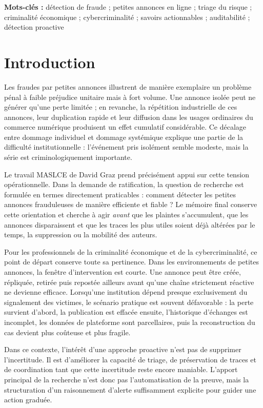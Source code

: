 \documentclass[10pt,a4paper]{article}
\begin{document}
\textbf{Mots-clés :} détection de fraude ; petites annonces en ligne ; triage du risque ; criminalité économique ; cybercriminalité ; savoirs actionnables ; auditabilité ; détection proactive

\newpage

\tableofcontents

\newpage

\section{Introduction}
Les fraudes par petites annonces illustrent de manière exemplaire un problème pénal à faible préjudice unitaire mais à fort volume. Une annonce isolée peut ne générer qu'une perte limitée ; en revanche, la répétition industrielle de ces annonces, leur duplication rapide et leur diffusion dans les usages ordinaires du commerce numérique produisent un effet cumulatif considérable. Ce décalage entre dommage individuel et dommage systémique explique une partie de la difficulté institutionnelle : l'événement pris isolément semble modeste, mais la série est criminologiquement importante.

Le travail MASLCE de David Graz prend précisément appui sur cette tension opérationnelle. Dans la demande de ratification, la question de recherche est formulée en termes directement praticables : comment détecter les petites annonces frauduleuses de manière efficiente et fiable ? Le mémoire final conserve cette orientation et cherche à agir \emph{avant} que les plaintes s'accumulent, que les annonces disparaissent et que les traces les plus utiles soient déjà altérées par le temps, la suppression ou la mobilité des auteurs.

Pour les professionnels de la criminalité économique et de la cybercriminalité, ce point de départ conserve toute sa pertinence. Dans les environnements de petites annonces, la fenêtre d'intervention est courte. Une annonce peut être créée, répliquée, retirée puis repostée ailleurs avant qu'une chaîne strictement réactive ne devienne efficace. Lorsqu'une institution dépend presque exclusivement du signalement des victimes, le scénario pratique est souvent défavorable : la perte survient d'abord, la publication est effacée ensuite, l'historique d'échanges est incomplet, les données de plateforme sont parcellaires, puis la reconstruction du cas devient plus coûteuse et plus fragile.

Dans ce contexte, l'intérêt d'une approche proactive n'est pas de supprimer l'incertitude. Il est d'améliorer la capacité de triage, de préservation de traces et de coordination tant que cette incertitude reste encore maniable. L'apport principal de la recherche n'est donc pas l'automatisation de la preuve, mais la structuration d'un raisonnement d'alerte suffisamment explicite pour guider une action graduée.
\end{document}
